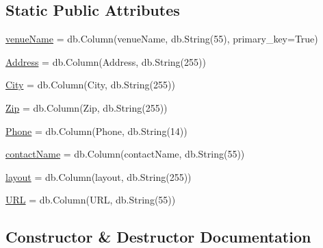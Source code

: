 \subsection*{Static Public Attributes}
\begin{DoxyCompactItemize}
\item 
\hyperlink{class_web_content_1_1classes_1_1venues_a9b9a18b684f7b9e71a8068443cd008d2}{venue\+Name} = db.\+Column(\textquotesingle{}venue\+Name\textquotesingle{}, db.\+String(55), primary\+\_\+key=True)
\item 
\hyperlink{class_web_content_1_1classes_1_1venues_a5e482b9cf50927587cd0940be0a65eb4}{Address} = db.\+Column(\textquotesingle{}Address\textquotesingle{}, db.\+String(255))
\item 
\hyperlink{class_web_content_1_1classes_1_1venues_a1575dda3b6e4b1ba7b89b03e31cfb0c9}{City} = db.\+Column(\textquotesingle{}City\textquotesingle{}, db.\+String(255))
\item 
\hyperlink{class_web_content_1_1classes_1_1venues_ac3846ed9b5b20948852b9374dd35fd22}{Zip} = db.\+Column(\textquotesingle{}Zip\textquotesingle{}, db.\+String(255))
\item 
\hyperlink{class_web_content_1_1classes_1_1venues_a5bf3b821cbc920a6f970c36577a451a4}{Phone} = db.\+Column(\textquotesingle{}Phone\textquotesingle{}, db.\+String(14))
\item 
\hyperlink{class_web_content_1_1classes_1_1venues_a2bcc906a39635f4e154cff0a5d1070ad}{contact\+Name} = db.\+Column(\textquotesingle{}contact\+Name\textquotesingle{}, db.\+String(55))
\item 
\hyperlink{class_web_content_1_1classes_1_1venues_a68472a0e51533d6ee114f3668e262bd6}{layout} = db.\+Column(\textquotesingle{}layout\textquotesingle{}, db.\+String(255))
\item 
\hyperlink{class_web_content_1_1classes_1_1venues_a4c87fdcce94a8d92e888b0ef112da682}{U\+RL} = db.\+Column(\textquotesingle{}U\+RL\textquotesingle{}, db.\+String(55))
\end{DoxyCompactItemize}


\subsection{Constructor \& Destructor Documentation}
\mbox{\label{class_web_content_1_1classes_1_1venues_ad7ff0f4c4610450e6d2afb55ebab01cb}} 
